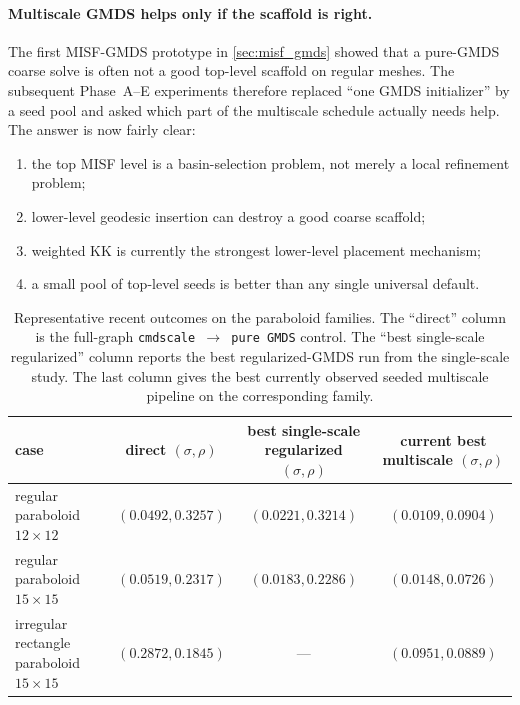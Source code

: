 \documentclass[twoside,11pt]{article}
\begin{document}
\paragraph{Multiscale GMDS helps only if the scaffold is right.}
The first MISF-GMDS prototype in \cref{sec:misf_gmds} showed that a pure-GMDS
coarse solve is often not a good top-level scaffold on regular meshes.  The
subsequent Phase~A--E experiments therefore replaced ``one GMDS initializer''
by a seed pool and asked which part of the multiscale schedule actually needs
help.  The answer is now fairly clear:
\begin{enumerate}
  \item the top MISF level is a basin-selection problem, not merely a local
  refinement problem;
  \item lower-level geodesic insertion can destroy a good coarse scaffold;
  \item weighted KK is currently the strongest lower-level placement mechanism;
  \item a small pool of top-level seeds is better than any single universal
  default.
\end{enumerate}

\begin{table}[t]
  \centering
  \small
  \caption{Representative recent outcomes on the paraboloid families.  The
  ``direct'' column is the full-graph \texttt{cmdscale $\rightarrow$ pure GMDS}
  control.  The ``best single-scale regularized'' column reports the best
  regularized-GMDS run from the single-scale study.  The last column gives the
  best currently observed seeded multiscale pipeline on the corresponding
  family.}
  \label{tab:recent_paraboloid_results}
  \begin{tabular}{lccc}
    \toprule
    case & direct $(\sigma,\rho)$ & best single-scale regularized $(\sigma,\rho)$ & current best multiscale $(\sigma,\rho)$ \\
    \midrule
    regular paraboloid $12\times 12$ & $(0.0492, 0.3257)$ & $(0.0221, 0.3214)$ & $(0.0109, 0.0904)$ \\
    regular paraboloid $15\times 15$ & $(0.0519, 0.2317)$ & $(0.0183, 0.2286)$ & $(0.0148, 0.0726)$ \\
    irregular rectangle paraboloid $15\times 15$ & $(0.2872, 0.1845)$ & --- & $(0.0951, 0.0889)$ \\
    \bottomrule
  \end{tabular}
\end{table}
\end{document}
